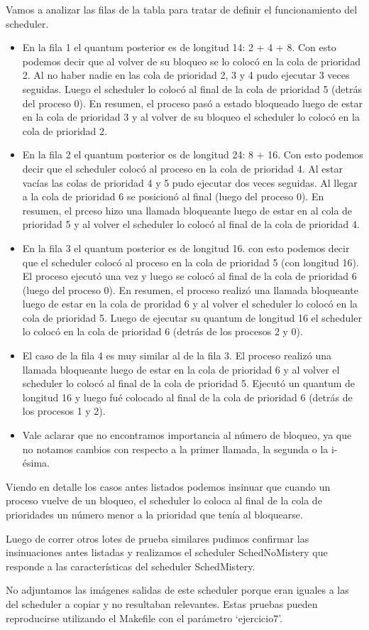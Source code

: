 \par Vamos a analizar las filas de la tabla para tratar de definir el funcionamiento del scheduler.
\begin{itemize}
	\item En la fila 1 el quantum posterior es de longitud 14: 2 + 4 + 8. Con esto podemos decir que al volver de su bloqueo se lo colocó en la cola de prioridad 2. Al no haber nadie en las cola de prioridad 2, 3 y 4 pudo ejecutar 3 veces seguidas. Luego el scheduler lo colocó al final de la cola de prioridad 5 (detrás del proceso 0). En resumen, el proceso pasó a estado bloqueado luego de estar en la cola de prioridad 3 y al volver de su bloqueo el scheduler lo colocó en la cola de prioridad 2.
	\item En la fila 2 el quantum posterior es de longitud 24: 8 + 16. Con esto podemos decir que el scheduler colocó al proceso en la cola de prioridad 4. Al estar vacías las colas de prioridad 4 y 5 pudo ejecutar dos veces seguidas. Al llegar a la cola de prioridad 6 se posicionó al final (luego del proceso 0). En resumen, el prceso hizo una llamada bloqueante luego de estar en al cola de prioridad 5 y al volver el scheduler lo colocó al final de la cola de prioridad 4.
	\item En la fila 3 el quantum posterior es de longitud 16. con esto podemos decir que el scheduler colocó al proceso en la cola de prioridad 5 (con longitud 16). El proceso ejecutó una vez y luego se colocó al final de la cola de prioridad 6 (luego del proceso 0). En resumen, el proceso realizó una llamada bloqueante luego de estar en la cola de proridad 6 y al volver el scheduler lo colocó en la cola de prioridad 5. Luego de ejecutar su quantum de longitud 16 el scheduler lo colocó en la cola de prioridad 6 (detrás de los procesos 2 y 0).
	\item El caso de la fila 4 es muy similar al de la fila 3. El proceso realizó una llamada bloqueante luego de estar en la cola de prioridad 6 y al volver el scheduler lo colocó al final de la cola de prioridad 5. Ejecutó un quantum de longitud 16 y luego fué colocado al final de la cola de prioridad 6 (detrás de los procesos 1 y 2).
  \item Vale aclarar que no encontramos importancia al número de bloqueo, ya que no notamos cambios con respecto a la primer llamada, la segunda o la i-ésima.
\end{itemize}
\par Viendo en detalle los casos antes listados podemos insinuar que cuando un proceso vuelve de un bloqueo, el scheduler lo coloca al final de la cola de prioridades un número menor a la prioridad que tenía al bloquearse.

\par Luego de correr otros lotes de prueba similares pudimos confirmar las insinuaciones antes listadas y realizamos el scheduler SchedNoMistery que responde a las características del scheduler SchedMistery.
\par No adjuntamos las imágenes salidas de este scheduler porque eran iguales a las del scheduler a copiar y no resultaban relevantes. Estas pruebas pueden reproducirse utilizando el Makefile con el parámetro `ejercicio7'.
